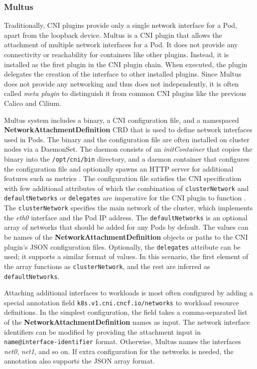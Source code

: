 \documentclass[english, 12pt, a4paper, sci, utf8, a-2b, online]{aaltothesis}
\newcommand{\mycomment}[3]{\textcolor{#1}{#2:~#3}}
\newcommand{\jb}[1]{\noindent\mycomment{aaltoRed}{JB}{#1}}
\begin{document}

\subsubsection{Multus}

Traditionally, CNI plugins provide only a single network interface for a Pod, apart from the loopback device.
Multus \cite{multus-cni} is a CNI plugin that allows the attachment of multiple network interfaces for a Pod.
It does not provide any connectivity or reachability for containers like other plugins.
Instead, it is installed as the first plugin in the CNI plugin chain.
When executed, the plugin delegates the creation of the interface to other installed plugins.
Since Multus does not provide any networking and thus does not independently, it is often called \emph{meta plugin} to distinguish it from common CNI plugins like the previous Calico and Cilium.

Multus system includes a binary, a CNI configuration file, and a namespaced \textbf{NetworkAttachmentDefinition} CRD that is used to define network interfaces used in Pods.
The binary and the configuration file are often installed on cluster nodes via a DaemonSet.
The daemon consists of an \emph{initContainer} that copies the binary into the \lstinline{/opt/cni/bin} directory, and a daemon container that configures the configuration file and optionally spawns an HTTP server for additional features such as metrics \cite{multus-cni}.
The configuration file satisfies the CNI specification with few additional attributes of which the combination of \lstinline{clusterNetwork} and \lstinline{defaultNetworks} or \lstinline{delegates} are imperative for the CNI plugin to function \cite{multus-cni-config}.
The \lstinline{clusterNetwork} specifies the main network of the cluster, which implements the \emph{eth0} interface and the Pod IP address.
The \lstinline{defaultNetworks} is an optional array of networks that should be added for any Pods by default.
The values can be names of the \textbf{NetworkAttachmentDefinition} objects or paths to the CNI plugin's JSON configuration files.
Optionally, the \lstinline{delegates} attribute can be used; it supports a similar format of values.
In this scenario, the first element of the array functions as \lstinline{clusterNetwork}, and the rest are inferred as \lstinline{defaultNetworks}.

Attaching additional interfaces to workloads is most often configured by adding a special annotation field \lstinline{k8s.v1.cni.cncf.io/networks} to workload resource definitions.
In the simplest configuration, the field takes a comma-separated list of the \textbf{NetworkAttachmentDefinition} names as input.
The network interface identifiers can be modified by providing the attachment input in \lstinline{name@interface-identifier} format.
Otherwise, Multus names the interfaces \emph{net0}, \emph{net1}, and so on.
If extra configuration for the networks is needed, the annotation also supports the JSON array format.
\end{document}
